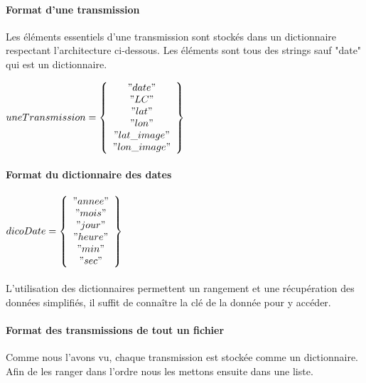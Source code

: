 \documentclass[11p, a4papert]{article}
\begin{document}
\paragraph{Format d'une transmission}
Les éléments essentiels d'une transmission sont stockés dans un dictionnaire respectant l'architecture ci-dessous. Les éléments sont tous des strings sauf "date" qui est un dictionnaire.
\vspace{1cm}
\begin{center}
$uneTransmission = \left\{\begin{array}{c} "date" \\"LC" \\"lat" \\"lon" \\"lat\_image" \\"lon\_image" \\ \end{array}\right\}$
\end{center}

\paragraph{Format du dictionnaire des dates}
\begin{center}
$dicoDate = \left\{\begin{array}{c} "annee" \\"mois" \\"jour" \\"heure" \\"min" \\"sec" \\ \end{array}\right\}$
\end{center}

\paragraph{}
L'utilisation des dictionnaires permettent un rangement et une récupération des données simplifiés, il suffit de connaître la clé de la donnée pour y accéder.

\paragraph{Format des transmissions de tout un fichier}
Comme nous l'avons vu, chaque transmission est stockée comme un dictionnaire. Afin de les ranger dans l'ordre nous les mettons ensuite dans une liste.
\end{document}

